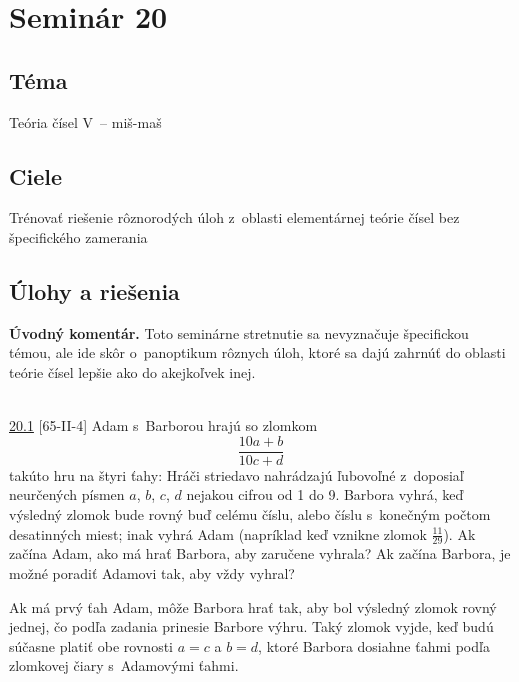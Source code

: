 \section*{Seminár 20}


\subsection*{Téma}
Teória čísel V~-- miš-maš
\subsection*{Ciele}
Trénovať riešenie rôznorodých úloh z~oblasti elementárnej teórie čísel bez špecifického zamerania

\subsection*{Úlohy a riešenia}
\textbf{Úvodný komentár.}
Toto seminárne stretnutie sa nevyznačuje špecifickou témou, ale ide skôr o~panoptikum rôznych úloh, ktoré sa dajú zahrnúť do oblasti teórie čísel lepšie ako do akejkoľvek inej.\\
\\
\begin{tcolorbox}[breakable,notitle,boxrule=0pt,colback=light-gray,colframe=light-gray]\ul{20.1} [65-II-4]
Adam s~Barborou hrajú so zlomkom
$$ \frac{10a + b}{10c + d}$$
takúto hru na štyri ťahy: Hráči striedavo nahrádzajú ľubovoľné z~doposiaľ neurčených písmen $a$, $b$, $c$, $d$ nejakou cifrou od 1 do 9. Barbora vyhrá, keď výsledný zlomok bude rovný buď celému číslu, alebo číslu s~konečným počtom desatinných miest; inak vyhrá Adam (napríklad keď vznikne zlomok $\frac{11}{29}$). Ak začína Adam, ako má hrať Barbora, aby zaručene vyhrala? Ak začína Barbora, je možné poradiť Adamovi tak, aby vždy vyhral?

\end{tcolorbox}

\rieh Ak má prvý ťah Adam, môže Barbora hrať tak, aby bol výsledný zlomok rovný jednej, čo podľa zadania prinesie Barbore výhru. Taký zlomok vyjde, keď budú súčasne platiť obe rovnosti $a = c$ a $b = d$, ktoré Barbora dosiahne ťahmi  podľa zlomkovej čiary s~Adamovými ťahmi.

